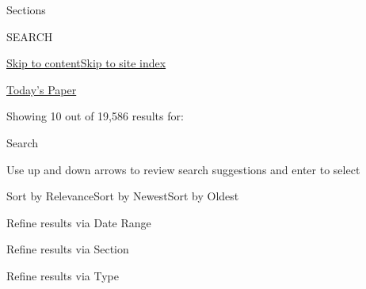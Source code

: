 Sections

SEARCH

\protect\hyperlink{site-content}{Skip to
content}\protect\hyperlink{site-index}{Skip to site index}

\href{https://myaccount.nytimes.com/auth/login?response_type=cookie\&client_id=vi}{}

\href{https://www.nytimes.com/section/todayspaper}{Today's Paper}

Showing 10 out of 19,586 results for:

Search

Use up and down arrows to review search suggestions and enter to select

Sort by RelevanceSort by NewestSort by Oldest

Refine results via Date Range

Refine results via Section

Refine results via Type

